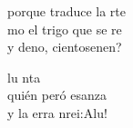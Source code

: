 \begin{cancion}
	porque traduce la rte\\
	mo el trigo que se re \\
	y deno, cientosenen?\jump\\
	\begin{chorus}%
		lu nta \\
		quién peró esanza\\
		y la erra nrei:Alu! \jump\\
	\end{chorus}%
	\jump
\end{cancion}%
